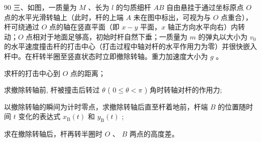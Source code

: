 \begin{problem}[第35届全国中学生物理竞赛复赛][刚体转动与碰撞]{90}
三、如图，一质量为 $M$ 、长为 $l$ 的匀质细杆 $AB$ 自由悬挂于通过坐标原点 $O$ 点的水平光滑转轴上（此时，杆的上端 $A$ 未在图中标出，可视为与 $O$ 点重合），杆可绕通过 $O$ 点的轴在竖直平面（即 $x-y$ 平面，$x$ 轴正方向水平向右）内转动；$O$ 点相对于地面足够高，初始时杆自然下垂；一质量为 $m$ 的弹丸以大小为 $v_{0}$ 的水平速度撞击杆的打击中心（打击过程中轴对杆的水平作用力为零）并很快嵌入杆中。在杆转半圈至竖直状态时立即撤除转轴。重力加速度大小为 $g$ 。
\begin{subproblem}
求杆的打击中心到 $O$ 点的距离；
\end{subproblem}
\begin{subproblem}
求撤除转轴前, 杆被撞击后转过 $\theta$ ( $0 \leq \theta < \pi$ ) 角时转轴对杆的作用力;
\end{subproblem}
\begin{subproblem}
以撤除转轴的瞬间为计时零点，求撤除转轴后直至杆着地前，杆端 $B$ 的位置随时间 $t$ 变化的表达式 $x_{\mathrm{B}}(t)$ 和 $y_{\mathrm{B}}(t)$ ;
\end{subproblem}
\begin{subproblem}
求在撤除转轴后，杆再转半圈时 $O$ 、 $B$ 两点的高度差。
\end{subproblem}
\end{problem}


